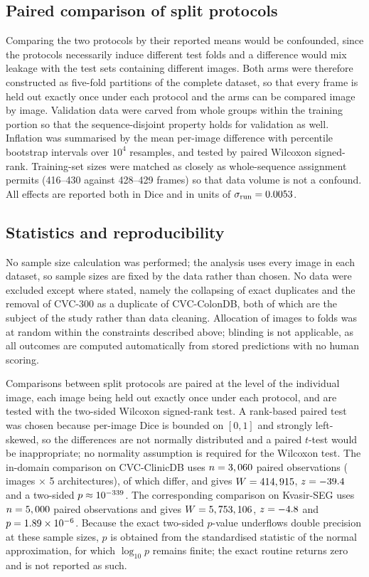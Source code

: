 \documentclass[11pt]{article}
\begin{document}
\subsection*{Paired comparison of split protocols}
Comparing the two protocols by their reported means would be confounded,
since the protocols necessarily induce different test folds and a difference
would mix leakage with the test sets containing different images. Both arms
were therefore constructed as five-fold partitions of the complete dataset, so
that every frame is held out exactly once under each protocol and the arms can
be compared image by image. Validation data were carved from whole groups
within the training portion so that the sequence-disjoint property holds for
validation as well. Inflation was summarised by the mean per-image difference
with percentile bootstrap intervals over $10^4$ resamples, and tested by
paired Wilcoxon signed-rank. Training-set sizes were matched as closely as
whole-sequence assignment permits (416--430 against 428--429 frames) so that
data volume is not a confound. All effects are reported both in Dice and in
units of $\sigma_{\mathrm{run}} = 0.0053{}$.

\subsection*{Statistics and reproducibility}
No sample size calculation was performed; the analysis uses every image in
each dataset, so sample sizes are fixed by the data rather than chosen. No
data were excluded except where stated, namely the collapsing of exact
duplicates and the removal of CVC-300 as a duplicate of CVC-ColonDB, both of
which are the subject of the study rather than data cleaning. Allocation of
images to folds was at random within the constraints described above;
blinding is not applicable, as all outcomes are computed automatically from
stored predictions with no human scoring.

Comparisons between split protocols are paired at the level of the individual
image, each image being held out exactly once under each protocol, and are
tested with the two-sided Wilcoxon signed-rank test. A rank-based paired test
was chosen because per-image Dice is bounded on $[0,1]$ and strongly
left-skewed, so the differences are not normally distributed and a paired
$t$-test would be inappropriate; no normality assumption is required for the
Wilcoxon test. The in-domain comparison on CVC-ClinicDB uses
$n = 3,060{}$ paired observations
(\InflationClinicN{} images $\times$ 5 architectures), of which
\InflationClinicNonzero{} differ, and gives
$W = 414,915{}$, $z = -39.4{}$ and a two-sided
$p \approx 10^{-339{}}$. The corresponding comparison on
Kvasir-SEG uses $n = 5,000{}$ paired observations and gives
$W = 5,753,106{}$, $z = -4.8{}$ and
$p = 1.89 \times 10^{-6}{}$. Because the exact two-sided $p$-value underflows
double precision at these sample sizes, $p$ is obtained from the standardised
statistic of the normal approximation, for which $\log_{10} p$ remains
finite; the exact routine returns zero and is not reported as such.
\end{document}
